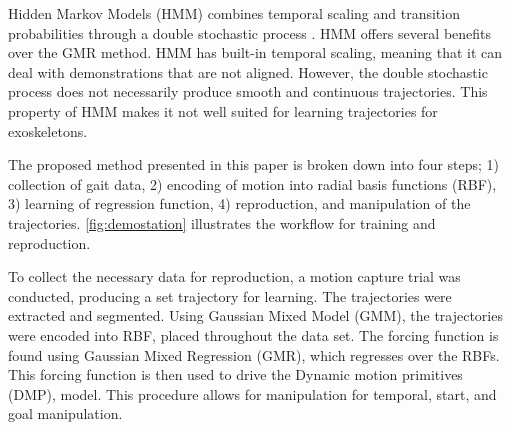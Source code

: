 Hidden Markov Models (HMM) combines temporal scaling and transition probabilities through a double stochastic process \cite{calinon2007learning}. HMM offers several benefits over the GMR method. HMM has built-in temporal scaling, meaning that it can deal with demonstrations that are not aligned. However, the double stochastic process does not necessarily produce smooth and continuous trajectories. This property of HMM makes it not well suited for learning trajectories for exoskeletons.      

The proposed method presented in this paper is broken down into four steps; 1) collection of gait data, 2) encoding of motion into radial basis functions (RBF), 3) learning of regression function, 4) reproduction, and manipulation of the trajectories. \autoref{fig:demostation} illustrates the workflow for training and reproduction.

To collect the necessary data for reproduction, a motion capture trial was conducted, producing a set trajectory for learning. The trajectories were extracted and segmented. Using Gaussian Mixed Model (GMM), the trajectories were encoded into RBF, placed throughout the data set. The forcing function is found using Gaussian Mixed Regression (GMR), which regresses over the RBFs. This forcing function is then used to drive the Dynamic motion primitives (DMP), model. This procedure allows for manipulation for temporal, start, and goal manipulation.  





